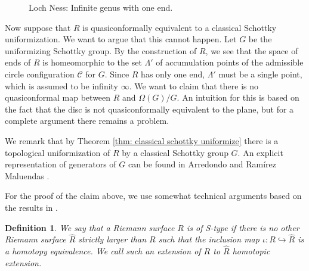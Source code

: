 \documentclass[12pt]{amsart}
\theoremstyle{plain}
\newtheorem{definition}[thm]{Definition}
\begin{document}
\begin{figure}[hbtp]
\centering
{}
\vspace{-3.5cm}
\caption{Loch Ness: Infinite genus with one end.}
\label{Loch Ness}
\end{figure}

Now suppose that $R$ is quasiconformally equivalent to a classical Schottky uniformization.  
We want to argue that this cannot happen. Let $G$ be the uniformizing Schottky group. 
By the construction of $R$, we see that the space of ends of $R$ is homeomorphic to
the set $\Lambda'$ of accumulation points of the admissible circle configuration $\mathcal C$ for $G$.
Since $R$ has only one end, $\Lambda'$ must be a single point, which is assumed to be  infinity $\infty$. 
We want to claim that there is no quasiconformal map between $R$ and $\Omega(G)/G$.
An intuition for this is based on the fact that the disc is not quasiconformally equivalent to the plane, 
but for a complete argument there remains a problem. 

We remark that by Theorem \ref{thm: classical schottky uniformize} there is a topological
uniformization of $R$ by a classical Schottky group $G$. An explicit
representation of generators of $G$ can be found in Arredondo and Ram\'irez Maluendas \cite{AR2}.

For the proof of the claim above, we use somewhat technical arguments based on the results in \cite{MS}.

\begin{definition}
{\rm
We say that a Riemann surface $R$ is of {\it S-type} if there is no other Riemann surface $\widehat R$
strictly larger than $R$ such that the inclusion map $\iota:R \hookrightarrow \widehat R$ is a homotopy equivalence.
We call such an extension of $R$ to $\widehat R$ homotopic extension.
}
\end{definition}
\end{document}
